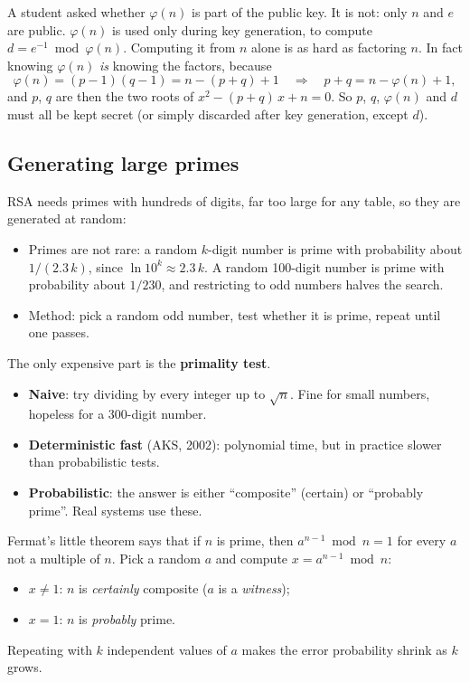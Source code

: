 \begin{remark}
A student asked whether $\varphi(n)$ is part of the public key. It is not: only $n$ and $e$ are public. $\varphi(n)$ is used only during key generation, to compute $d = e^{-1} \bmod \varphi(n)$. Computing it from $n$ alone is as hard as factoring $n$. In fact knowing $\varphi(n)$ \emph{is} knowing the factors, because
\[
\varphi(n) = (p-1)(q-1) = n - (p+q) + 1 \quad\Longrightarrow\quad p + q = n - \varphi(n) + 1,
\]
and $p$, $q$ are then the two roots of $x^2 - (p+q)\,x + n = 0$. So $p$, $q$, $\varphi(n)$ and $d$ must all be kept secret (or simply discarded after key generation, except $d$).
\end{remark}

\subsection{Generating large primes}

RSA needs primes with hundreds of digits, far too large for any table, so they are generated at random:
\begin{itemize}
    \item Primes are not rare: a random $k$-digit number is prime with probability about $1/(2.3\,k)$, since $\ln 10^k \approx 2.3\,k$. A random 100-digit number is prime with probability about $1/230$, and restricting to odd numbers halves the search.
    \item Method: pick a random odd number, test whether it is prime, repeat until one passes.
\end{itemize}
The only expensive part is the \textbf{primality test}.
\begin{itemize}
    \item \textbf{Naive}: try dividing by every integer up to $\sqrt{n}$. Fine for small numbers, hopeless for a 300-digit number.
    \item \textbf{Deterministic fast} (AKS, 2002): polynomial time, but in practice slower than probabilistic tests.
    \item \textbf{Probabilistic}: the answer is either \enquote{composite} (certain) or \enquote{probably prime}. Real systems use these.
\end{itemize}

\begin{definition}
Fermat's little theorem says that if $n$ is prime, then $a^{n-1} \bmod n = 1$ for every $a$ not a multiple of $n$. Pick a random $a$ and compute $x = a^{n-1} \bmod n$:
\begin{itemize}
    \item $x \neq 1$: $n$ is \emph{certainly} composite ($a$ is a \emph{witness});
    \item $x = 1$: $n$ is \emph{probably} prime.
\end{itemize}
Repeating with $k$ independent values of $a$ makes the error probability shrink as $k$ grows.
\end{definition}

